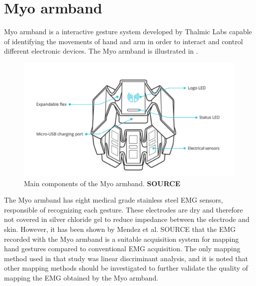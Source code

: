 \section{Myo armband}

Myo armband is a interactive gesture system developed by Thalmic Labs capable of identifying the movements of hand and arm in order to interact and control different electronic devices. The Myo armband is illustrated in . 

\begin{figure}[H]                    
	\includegraphics[width=.5\textwidth]{figures/myob/armband}  %
	\caption{Main components of the Myo armband. \textbf{SOURCE}}
	\label{fig:armband}  %
\end{figure}



The Myo armband has eight medical grade stainless steel EMG sensors, responsible of recognizing each gesture. These electrodes are dry and therefore not covered in silver chloride gel to reduce impedance between the electrode and skin. However, it has been shown by Mendez et al. SOURCE that the EMG recorded with the Myo armband is a suitable acquisition system for mapping hand gestures compared to conventional EMG acquisition. The only mapping method used in that study was linear discriminant analysis, and it is noted that other mapping methods should be investigated to further validate the quality of mapping the EMG obtained by the Myo armband. 

